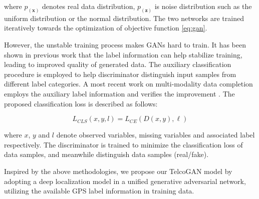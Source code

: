 where $p_(\textbf{x})$ denotes real data distribution, $p_(\textbf{z})$ is noise distribution such as the uniform distribution or the normal distribution. The two networks are trained iteratively towards the optimization of objective function \ref{eq:gan}.

However, the unstable training process makes GANs hard to train. It has been shown in previous work \cite{DBLP:conf/icml/OdenaOS17} that the label information can help stabilize training, leading to improved quality of generated data. The auxiliary classification procedure is employed to help discriminator distinguish input samples from different label categories. A most recent work on multi-modality data completion employs the auxiliary label information and verifies the improvement \cite{DBLP:conf/kdd/CaiWGSJ18}. The proposed classification loss is described as follows:

\begin{equation}\label{eq:multi}
  L_{CLS}(x, y, l)=L_{CE}(D(x,y),\ell)
\end{equation}

where $x$, $y$ and $l$ denote observed variables, missing variables and associated label respectively. The discriminator is trained to minimize the classification loss of data samples, and meanwhile distinguish data samples (real/fake).

Inspired by the above methodologies, we propose our TelcoGAN model by adopting a deep localization model in a unified generative adversarial network, utilizing the available GPS label information in training data. 
